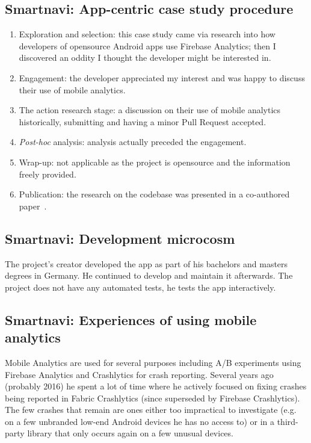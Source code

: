 \subsection{Smartnavi: App-centric case study procedure}
{\small
\begin{enumerate}
    \itemsep0em
    \item Exploration and selection: this case study came via research into how developers of opensource Android apps use Firebase Analytics; then I discovered an oddity I thought the developer might be interested in.
    \item Engagement: the developer appreciated my interest and was happy to discuss their use of mobile analytics.
    \item The action research stage:  a discussion on their use of mobile analytics historically, submitting and having a minor Pull Request accepted.
    \item \textit{Post-hoc} analysis: analysis actually preceded the engagement.
    \item Wrap-up: not applicable as the project is opensource and the information freely provided.
    \item Publication: the research on the codebase was presented in a co-authored paper~\citep{harty2021_logging_practices_with_mobile_analytics}. 
\end{enumerate}
}


\subsection{Smartnavi: Development microcosm}
The project's creator developed the app as part of his bachelors and masters degrees in Germany. He continued to develop and maintain it afterwards. The project does not have any automated tests, he tests the app interactively. %

\subsection{Smartnavi: Experiences of using mobile analytics}
Mobile Analytics are used for several purposes including A/B experiments using Firebase Analytics and Crashlytics for crash reporting. Several years ago (probably 2016) he spent a lot of time where he actively focused on fixing crashes being reported in Fabric Crashlytics (since superseded by Firebase Crashlytics). The few crashes that remain are ones either too impractical to investigate (e.g. on a few unbranded low-end Android devices he has no access to) or in a third-party library that only occurs again on a few unusual devices.

